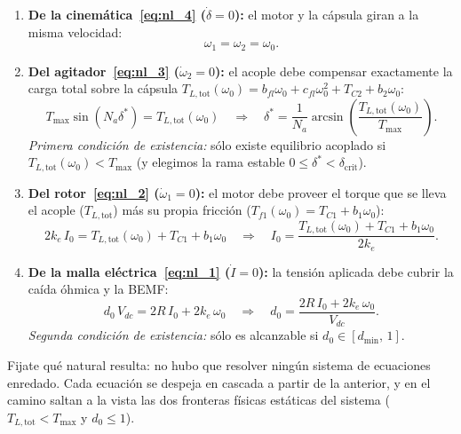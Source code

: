\documentclass[11pt,a4paper,oneside]{book}
\begin{document}
\begin{enumerate}
  \item \textbf{De la cinemática~\eqref{eq:nl_4} ($\dot\delta = 0$):}
        el motor y la cápsula giran a la misma velocidad:
        \begin{equation}
          \omega_1 = \omega_2 = \omega_0.
          \label{eq:eq_w}
        \end{equation}
  \item \textbf{Del agitador~\eqref{eq:nl_3} ($\dot\omega_2 = 0$):}
        el acople debe compensar exactamente la carga total sobre la cápsula
        $T_{L,\text{tot}}(\omega_0) = b_{fl}\omega_0 + c_{fl}\omega_0^2 + T_{C2} + b_2\omega_0$:
        \begin{equation}
          T_{\max}\sin(N_a\delta^\ast) = T_{L,\text{tot}}(\omega_0)
          \quad\Longrightarrow\quad
          \delta^\ast = \frac{1}{N_a}\arcsin\!\left(\frac{T_{L,\text{tot}}(\omega_0)}{T_{\max}}\right).
          \label{eq:eq_delta}
        \end{equation}
        \emph{Primera condición de existencia:} sólo existe equilibrio acoplado
        si $T_{L,\text{tot}}(\omega_0) < T_{\max}$ (y elegimos la rama estable
        $0 \le \delta^\ast < \delta_{\text{crit}}$).
  \item \textbf{Del rotor~\eqref{eq:nl_2} ($\dot\omega_1 = 0$):}
        el motor debe proveer el torque que se lleva el acople ($T_{L,\text{tot}}$)
        más su propia fricción ($T_{f1}(\omega_0) = T_{C1} + b_1\omega_0$):
        \begin{equation}
          2k_e\,I_0 = T_{L,\text{tot}}(\omega_0) + T_{C1} + b_1\omega_0
          \quad\Longrightarrow\quad
          I_0 = \frac{T_{L,\text{tot}}(\omega_0) + T_{C1} + b_1\omega_0}{2k_e}.
          \label{eq:eq_I}
        \end{equation}
  \item \textbf{De la malla eléctrica~\eqref{eq:nl_1} ($\dot I = 0$):}
        la tensión aplicada debe cubrir la caída óhmica y la BEMF:
        \begin{equation}
          d_0\,V_{dc} = 2R\,I_0 + 2k_e\,\omega_0
          \quad\Longrightarrow\quad
          d_0 = \frac{2R\,I_0 + 2k_e\,\omega_0}{V_{dc}}.
          \label{eq:eq_d}
        \end{equation}
        \emph{Segunda condición de existencia:} sólo es alcanzable si
        $d_0 \in [d_{\min},\, 1]$.
\end{enumerate}

Fijate qué natural resulta: no hubo que resolver ningún sistema de ecuaciones
enredado. Cada ecuación se despeja en cascada a partir de la anterior, y en el
camino saltan a la vista las dos fronteras físicas estáticas del sistema
($T_{L,\text{tot}} < T_{\max}$ y $d_0 \le 1$).
\end{document}
